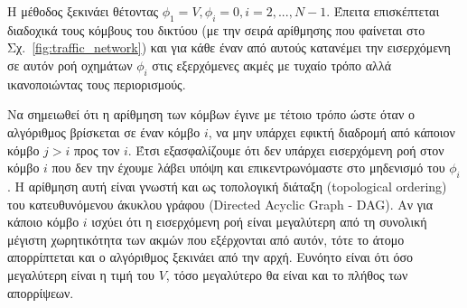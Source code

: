 \documentclass[a4paper,12pt]{article}
\begin{document}
Η μέθοδος ξεκινάει θέτοντας $\phi_1 = V, \phi_i = 0, i=2,...,N-1$. Έπειτα επισκέπτεται διαδοχικά 
τους κόμβους του δικτύου (με την σειρά αρίθμησης που φαίνεται στο Σχ.~\ref{fig:traffic_network}) και για κάθε έναν
από αυτούς κατανέμει την εισερχόμενη σε αυτόν ροή οχημάτων $\phi_i$ στις εξερχόμενες ακμές με τυχαίο τρόπο αλλά 
ικανοποιώντας τους περιορισμούς. 

Να σημειωθεί ότι η αρίθμηση των κόμβων έγινε με τέτοιο τρόπο ώστε όταν ο αλγόριθμος βρίσκεται σε έναν κόμβο $i$, 
να μην υπάρχει εφικτή διαδρομή από κάποιον κόμβο $j > i$ προς τον $i$. Έτσι εξασφαλίζουμε ότι δεν 
υπάρχει εισερχόμενη ροή στον κόμβο $i$ που δεν την έχουμε λάβει υπόψη και επικεντρωνόμαστε στο μηδενισμό του 
$\phi_i$. Η αρίθμηση αυτή είναι γνωστή και ως τοπολογική διάταξη (topological
ordering) του κατευθυνόμενου άκυκλου γράφου
(Directed Acyclic Graph - DAG). Αν για κάποιο κόμβο $i$ ισχύει ότι η εισερχόμενη ροή είναι 
μεγαλύτερη από τη συνολική μέγιστη χωρητικότητα των ακμών που εξέρχονται από αυτόν, τότε το άτομο απορρίπτεται 
και ο αλγόριθμος ξεκινάει από την αρχή. Ευνόητο είναι ότι όσο μεγαλύτερη είναι η τιμή του $V$, τόσο μεγαλύτερο θα 
είναι και το πλήθος των απορρίψεων.
\end{document}
